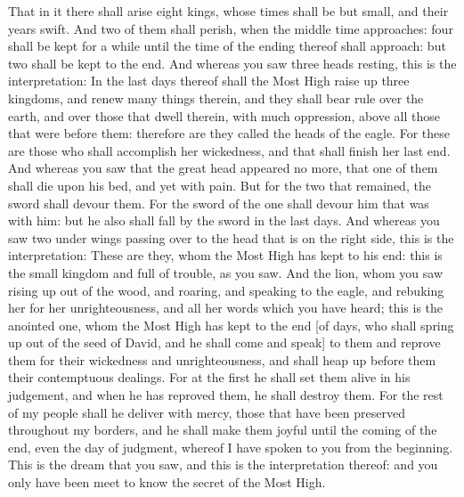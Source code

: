 {That in it there shall arise eight kings, whose times shall be but small, and their years swift.
And two of them shall perish, when the middle time approaches: four shall be kept for a while until the time of the ending thereof shall approach: but two shall be kept to the end.
And whereas you saw three heads resting, this is the interpretation:
In the last days thereof shall the Most High raise up three
 kingdoms, and renew many things therein, and they shall bear rule over the earth,
and over those that dwell therein, with much oppression, above all those that were before them: therefore are they called the heads of the eagle.
For these are those who shall accomplish her wickedness, and that shall finish her last end.
And whereas you saw that the great head appeared no more,
{} that one of them shall die upon his bed, and yet with pain.
But for the two that remained, the sword shall devour them.
For the sword of the one shall devour him that was with him: but he also shall fall by the sword in the last days.
And whereas you saw two under wings passing
 over to the head that is on the right side,
this is the interpretation: These are they, whom the Most High has kept to his end: this is the small kingdom and full of trouble, as you saw.
And the lion, whom you saw rising up out of the wood, and roaring, and speaking to the eagle, and rebuking her for her unrighteousness, and all her words which you have heard;
this is the anointed one, whom the Most High has kept to the end
 [of days, who shall spring up out of the seed of David, and he shall come and speak] to them and reprove them for their wickedness and unrighteousness, and shall
 heap up before them their contemptuous dealings.
For at the first he shall set them alive in his judgement, and when he has reproved them, he shall destroy them.
For the rest of my people shall he deliver with mercy, those that have been preserved throughout my borders, and he shall make them joyful until the coming of the end, even the day of judgment, whereof I have spoken to you from the beginning.
This is the dream that you saw, and this is the interpretation thereof:
and you only have been meet to know the secret of the Most High.
}
